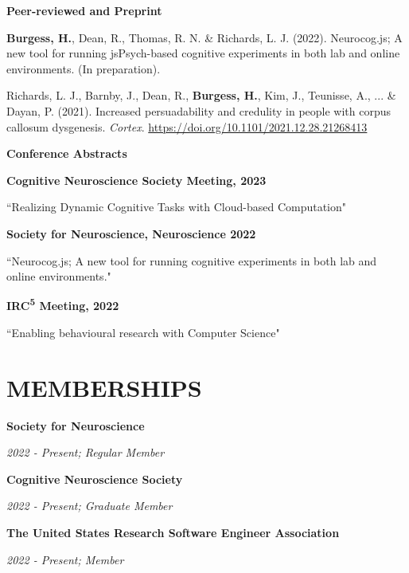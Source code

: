 \documentclass{article}
\begin{document}
  \medbreak

  {\large\textbf{Peer-reviewed and Preprint}}

  \textbf{Burgess, H.}, Dean, R., Thomas, R. N. \& Richards, L. J. (2022). Neurocog.js; A new tool for running jsPsych-based cognitive experiments in both lab and online environments. (In preparation).

  \medbreak

  Richards, L. J., Barnby, J., Dean, R., \textbf{Burgess, H.}, Kim, J., Teunisse, A., ... \& Dayan, P. (2021). Increased persuadability and credulity in people with corpus callosum dysgenesis. \textit{Cortex}.
  \href{https://doi.org/10.1101/2021.12.28.21268413}{\color{blue}https://doi.org/10.1101/2021.12.28.21268413}

  \medbreak

  {\large\textbf{Conference Abstracts}}

  \textbf{Cognitive Neuroscience Society Meeting, 2023}

  ``Realizing Dynamic Cognitive Tasks with Cloud-based Computation"

  \medbreak

  \textbf{Society for Neuroscience, Neuroscience 2022}

  ``Neurocog.js; A new tool for running cognitive experiments in both lab and online environments."

  \medbreak

  \textbf{IRC\textsuperscript{5} Meeting, 2022}

  ``Enabling behavioural research with Computer Science"

  \section*{\centering\uppercase{Memberships}}

  \large\textbf{Society for Neuroscience}

  \textit{2022 - Present; Regular Member}

  \medbreak

  \large\textbf{Cognitive Neuroscience Society}

  \textit{2022 - Present; Graduate Member}

  \medbreak

  \large\textbf{The United States Research Software Engineer Association}

  \textit{2022 - Present; Member}

  \medbreak
\end{document}
